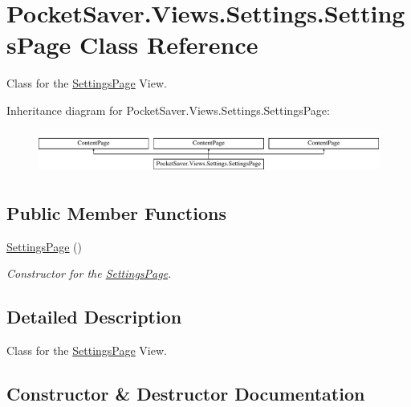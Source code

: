 \hypertarget{class_pocket_saver_1_1_views_1_1_settings_1_1_settings_page}{}\section{Pocket\+Saver.\+Views.\+Settings.\+Settings\+Page Class Reference}
\label{class_pocket_saver_1_1_views_1_1_settings_1_1_settings_page}


Class for the \hyperlink{class_pocket_saver_1_1_views_1_1_settings_1_1_settings_page}{Settings\+Page} View.  


Inheritance diagram for Pocket\+Saver.\+Views.\+Settings.\+Settings\+Page\+:\begin{figure}[H]
\begin{center}
\leavevmode
\includegraphics[height=1.464052cm]{class_pocket_saver_1_1_views_1_1_settings_1_1_settings_page}
\end{center}
\end{figure}
\subsection*{Public Member Functions}
\begin{DoxyCompactItemize}
\item 
\hyperlink{class_pocket_saver_1_1_views_1_1_settings_1_1_settings_page_a14d3be3fc03e6f84aaa08ee172bd3c3a}{Settings\+Page} ()
\begin{DoxyCompactList}\small\item\em Constructor for the \hyperlink{class_pocket_saver_1_1_views_1_1_settings_1_1_settings_page}{Settings\+Page}. \end{DoxyCompactList}\end{DoxyCompactItemize}


\subsection{Detailed Description}
Class for the \hyperlink{class_pocket_saver_1_1_views_1_1_settings_1_1_settings_page}{Settings\+Page} View. 



\subsection{Constructor \& Destructor Documentation}
\mbox{\label{class_pocket_saver_1_1_views_1_1_settings_1_1_settings_page_a14d3be3fc03e6f84aaa08ee172bd3c3a}} 
